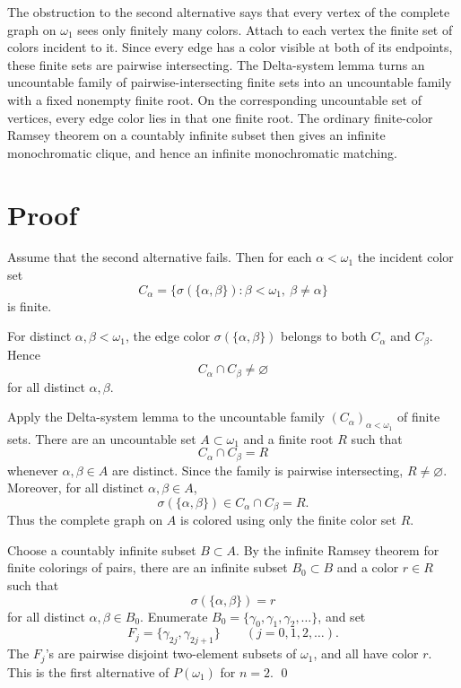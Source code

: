 \documentclass[11pt]{article}
\begin{document}
The obstruction to the second alternative says that every vertex of the complete graph on \(\omega_1\) sees only finitely many colors.  Attach to each vertex the finite set of colors incident to it.  Since every edge has a color visible at both of its endpoints, these finite sets are pairwise intersecting.  The Delta-system lemma turns an uncountable family of pairwise-intersecting finite sets into an uncountable family with a fixed nonempty finite root.  On the corresponding uncountable set of vertices, every edge color lies in that one finite root.  The ordinary finite-color Ramsey theorem on a countably infinite subset then gives an infinite monochromatic clique, and hence an infinite monochromatic matching.

\section*{Proof}

Assume that the second alternative fails.  Then for each \(\alpha<\omega_1\) the incident color set
\[
  C_\alpha=\{\sigma(\{\alpha,\beta\}):\beta<\omega_1,\ \beta\ne\alpha\}
\]
is finite.

For distinct \(\alpha,\beta<\omega_1\), the edge color \(\sigma(\{\alpha,\beta\})\) belongs to both \(C_\alpha\) and \(C_\beta\).  Hence
\[
  C_\alpha\cap C_\beta\ne\varnothing
\]
for all distinct \(\alpha,\beta\).

Apply the Delta-system lemma to the uncountable family \((C_\alpha)_{\alpha<\omega_1}\) of finite sets.  There are an uncountable set \(A\subset\omega_1\) and a finite root \(R\) such that
\[
  C_\alpha\cap C_\beta=R
\]
whenever \(\alpha,\beta\in A\) are distinct.  Since the family is pairwise intersecting, \(R\ne\varnothing\).  Moreover, for all distinct \(\alpha,\beta\in A\),
\[
  \sigma(\{\alpha,\beta\})\in C_\alpha\cap C_\beta=R.
\]
Thus the complete graph on \(A\) is colored using only the finite color set \(R\).

Choose a countably infinite subset \(B\subset A\).  By the infinite Ramsey theorem for finite colorings of pairs, there are an infinite subset \(B_0\subset B\) and a color \(r\in R\) such that
\[
  \sigma(\{\alpha,\beta\})=r
\]
for all distinct \(\alpha,\beta\in B_0\).  Enumerate \(B_0=\{\gamma_0,\gamma_1,\gamma_2,\ldots\}\), and set
\[
  F_j=\{\gamma_{2j},\gamma_{2j+1}\}\qquad(j=0,1,2,\ldots).
\]
The \(F_j\)'s are pairwise disjoint two-element subsets of \(\omega_1\), and all have color \(r\).  This is the first alternative of \(P(\omega_1)\) for \(n=2\).
\qed
\end{document}

